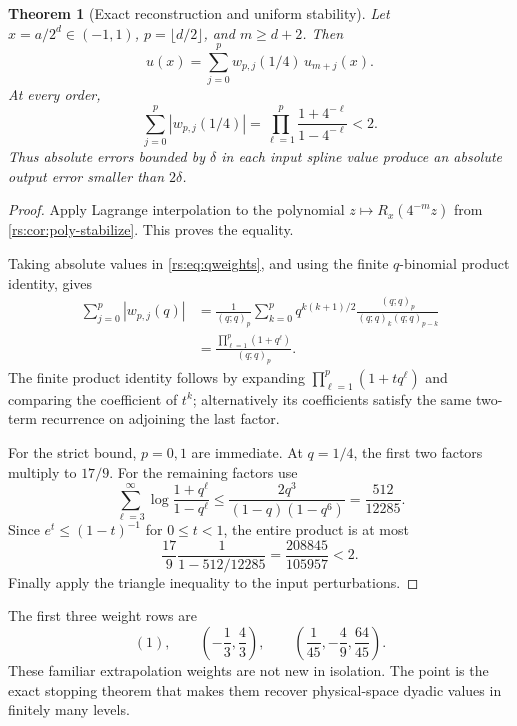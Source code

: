 \documentclass[11pt,a4paper,oneside,openany]{book}
\numberwithin{equation}{chapter}
\newtheorem{theorem}{Theorem}[chapter]
\theoremstyle{definition}
\theoremstyle{remark}
\begin{document}
\begin{theorem}[Exact reconstruction and uniform stability]\label{rs:thm:richardson}
Let $x=a/2^d\in(-1,1)$, $p=\lfloor d/2\rfloor$, and $m\geq d+2$.
Then
\begin{equation}
 \boxed{\quad u(x)=\sum_{j=0}^p w_{p,j}(1/4)\,u_{m+j}(x).\quad}
 \label{rs:eq:exact-richardson}
\end{equation}
At every order,
\begin{equation}
 \sum_{j=0}^p|w_{p,j}(1/4)|
 =\prod_{\ell=1}^p\frac{1+4^{-\ell}}{1-4^{-\ell}}<2.
 \label{rs:eq:stable-weights}
\end{equation}
Thus absolute errors bounded by $\delta$ in each input spline value
produce an absolute output error smaller than $2\delta$.
\end{theorem}
\begin{proof}
Apply Lagrange interpolation to the polynomial
$z\mapsto R_x(4^{-m}z)$ from \cref{rs:cor:poly-stabilize}. This proves
the equality.

Taking absolute values in \eqref{rs:eq:qweights}, and using the finite
$q$-binomial product identity, gives
\begin{align}
 \sum_{j=0}^p|w_{p,j}(q)|
 &=\frac1{(q;q)_p}\sum_{k=0}^p
      q^{k(k+1)/2}\frac{(q;q)_p}{(q;q)_k(q;q)_{p-k}}\nonumber\\
 &=\frac{\prod_{\ell=1}^p(1+q^\ell)}{(q;q)_p}.
 \label{rs:eq:qnorm-proof}
\end{align}
The finite product identity follows by expanding
$\prod_{\ell=1}^p(1+tq^\ell)$ and comparing the coefficient of
$t^k$; alternatively its coefficients satisfy the same two-term
recurrence on adjoining the last factor.

For the strict bound, $p=0,1$ are immediate. At $q=1/4$, the first
two factors multiply to $17/9$. For the remaining factors use
\begin{equation}
 \sum_{\ell=3}^{\infty}\log\frac{1+q^\ell}{1-q^\ell}
 \leq\frac{2q^3}{(1-q)(1-q^6)}=\frac{512}{12285}.
\end{equation}
Since $e^t\leq(1-t)^{-1}$ for $0\leq t<1$, the entire product is
at most
\begin{equation}
 \frac{17}{9}\frac1{1-512/12285}
 =\frac{208845}{105957}<2.
\end{equation}
Finally apply the triangle inequality to the input perturbations.
\end{proof}

The first three weight rows are
\begin{equation}
 (1),\qquad
 \left(-\frac13,\frac43\right),\qquad
 \left(\frac1{45},-\frac49,\frac{64}{45}\right).
\end{equation}
These familiar extrapolation weights are not new in isolation.
The point is the exact stopping theorem that makes them recover
physical-space dyadic values in finitely many levels.
\end{document}
